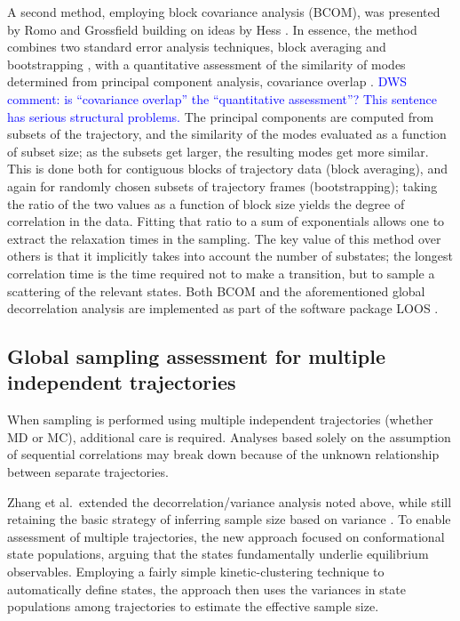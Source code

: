 A second method, employing block covariance analysis (BCOM), was presented by Romo and Grossfield \cite{Romo2011} building on ideas by Hess \cite{Hess2002}.  In essence, the method combines two standard error analysis techniques, block averaging \cite{Flyvbjerg-1989} and bootstrapping \cite{Tibshirani1998}, with a quantitative assessment of the similarity of modes determined from principal component analysis, covariance overlap \cite{Hess2002}.
\textcolor{blue}{DWS comment: is ``covariance overlap'' the ``quantitative assessment''? This sentence has serious structural problems.}
The principal components are computed from subsets of the trajectory, and the similarity of the modes evaluated as a function of subset size; as the subsets get larger, the resulting modes get more similar.  This is done both for contiguous blocks of trajectory data (block averaging), and again for randomly chosen subsets of trajectory frames (bootstrapping); taking the ratio of the two values as a function of block size yields the degree of correlation in the data.  Fitting that ratio to a sum of exponentials allows one to extract the relaxation times in the sampling.  The key value of this method over others is that it implicitly takes into account the number of substates; the longest correlation time is the time required not to make a transition, but to sample a scattering of the relevant states. Both BCOM and the aforementioned global decorrelation analysis are implemented as part of the software package LOOS \cite{LOOS,LOOS-JCC}.

\subsection{Global sampling assessment for multiple independent trajectories}
When sampling is performed using multiple independent trajectories (whether MD or MC), additional care is required.
Analyses based solely on the assumption of sequential correlations may break down because of the unknown relationship between separate trajectories.

Zhang et al.\ extended the decorrelation/variance analysis noted above, while still retaining the basic strategy of inferring sample size based on variance \cite{Zhang2010}.
To enable assessment of multiple trajectories, the new approach focused on conformational state populations, arguing that the states fundamentally underlie equilibrium observables.
Employing a fairly simple kinetic-clustering technique to automatically define states, the approach then uses the variances in state populations among trajectories to estimate the effective sample size.  %

